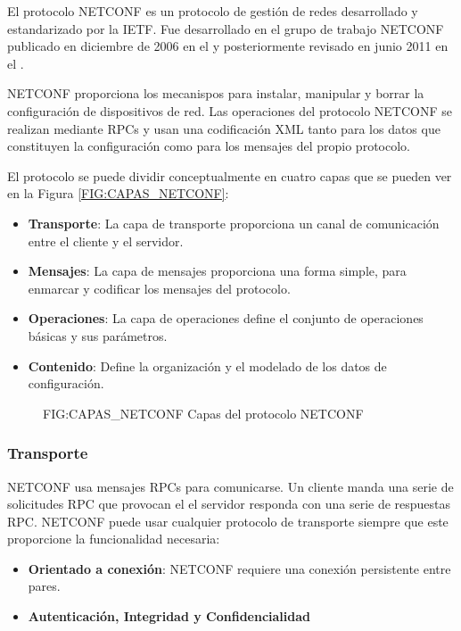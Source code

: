 El protocolo \gls{NETCONF} es un protocolo de gestión de redes desarrollado y estandarizado por la \gls{IETF}. Fue desarrollado en el grupo de trabajo NETCONF publicado en diciembre de 2006 en el  y posteriormente revisado en junio 2011 en el . 

\gls{NETCONF} proporciona los mecanispos para instalar, manipular y borrar la configuración de dispositivos de red. Las operaciones del protocolo \gls{NETCONF} se realizan mediante \glspl{RPC} y usan una codificación \gls{XML} tanto para los datos que constituyen la configuración como para los mensajes del propio protocolo. 

El protocolo se puede dividir conceptualmente en cuatro capas que se pueden ver en la Figura \ref{FIG:CAPAS_NETCONF}:
\begin{itemize}
    \item \textbf{Transporte}: La capa de transporte proporciona un canal de comunicación entre el cliente y el servidor.
    \item \textbf{Mensajes}: La capa de mensajes proporciona una forma simple, para enmarcar y codificar los mensajes del protocolo.
    \item \textbf{Operaciones}: La capa de operaciones define el conjunto de operaciones básicas y sus parámetros.
    \item \textbf{Contenido}: Define la organización y el modelado de los datos de configuración.
\end{itemize}

    
\begin{figure}
    [Capas del protocolo NETCONF]
    {FIG:CAPAS_NETCONF}
    {Capas del protocolo NETCONF}
\end{figure}

\subsubsection{Transporte}

\gls{NETCONF} usa mensajes \glspl{RPC} para comunicarse. Un cliente manda una serie de solicitudes \gls{RPC} que provocan el el servidor responda con una serie de respuestas RPC. \gls{NETCONF} puede usar cualquier protocolo de transporte siempre que este proporcione la funcionalidad necesaria:

\begin{itemize}
    \item \textbf{Orientado a conexión}: \gls{NETCONF} requiere una conexión persistente entre pares.
    \item \textbf{Autenticación, Integridad y Confidencialidad}
\end{itemize}

